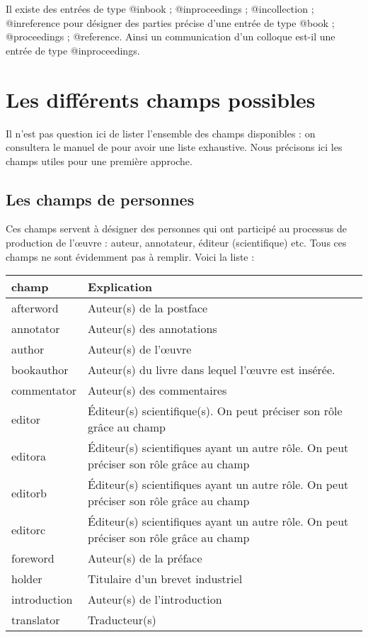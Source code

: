 Il existe des entrées de type @inbook ; @inproceedings ; @incollection ; @inreference pour désigner des parties précise d'une entrée de type @book ; @proceedings ; @reference. Ainsi un communication d'un colloque est-il une entrée de type @inproceedings.

\section{Les différents champs possibles}

Il n'est pas question ici de lister l'ensemble des champs disponibles : on consultera le manuel de  pour avoir une liste exhaustive. Nous précisons ici les champs utiles pour une première approche.

\subsection{Les champs de personnes}

Ces champs servent à désigner des personnes qui ont participé au processus de production de l'œuvre : auteur, annotateur, éditeur (scientifique) etc. Tous ces champs ne sont évidemment pas à remplir. Voici la liste  :


\begin{longtable}{ll}
	champ 		& Explication \\
	\endhead
	afterword		& Auteur(s) de la postface \\
	annotator		& Auteur(s) des annotations \\
	author		& Auteur(s) de l'œuvre    \\
	bookauthor		& Auteur(s) du livre dans lequel l'œuvre est insérée. \\
	commentator	& Auteur(s) des commentaires \\
	editor			& Éditeur(s) scientifique(s). On peut préciser son rôle grâce au champ \champ{editortype}	\\
	editora		& Éditeur(s) scientifiques ayant un autre rôle. On peut préciser son rôle grâce au champ \champ{editoratype}  \\
	editorb		& Éditeur(s) scientifiques ayant un autre rôle. On peut préciser son rôle grâce au champ \champ{editorbtype}  \\
	editorc		& Éditeur(s) scientifiques ayant un autre rôle. On peut préciser son rôle grâce au champ \champ{editorctype}  \\
	foreword		& Auteur(s) de la préface\\
	holder			& Titulaire d'un brevet industriel \\
	introduction		& Auteur(s) de l'introduction \\
	translator 		& Traducteur(s) 		\\
\end{longtable}

